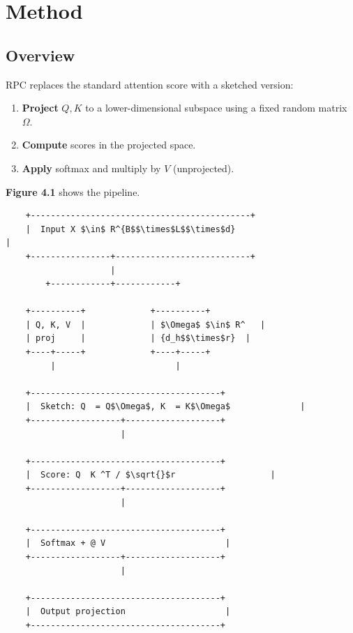 
\section{Method}

\subsection{Overview}

RPC replaces the standard attention score with a sketched version:

\begin{enumerate}
\item \textbf{Project} $Q, K$ to a lower-dimensional subspace using a fixed random
  matrix $\Omega$.
\item \textbf{Compute} scores in the projected space.
\item \textbf{Apply} softmax and multiply by $V$ (unprojected).

\end{enumerate}
\textbf{Figure 4.1} shows the pipeline.

\begin{lstlisting}
    +--------------------------------------------+
    |  Input X $\in$ R^{B$$\times$L$$\times$d}                        |
    +----------------+---------------------------+
                     |
        +------------+------------+
                                   
    +----------+             +----------+
    | Q, K, V  |             | $\Omega$ $\in$ R^   |
    | proj     |             | {d_h$$\times$r}  |
    +----+-----+             +----+-----+
         |                        |
                                   
    +--------------------------------------+
    |  Sketch: Q  = Q$\Omega$, K  = K$\Omega$              |
    +------------------+-------------------+
                       |
                        
    +--------------------------------------+
    |  Score: Q  K ^T / $\sqrt{}$r                   |
    +------------------+-------------------+
                       |
                        
    +--------------------------------------+
    |  Softmax + @ V                        |
    +------------------+-------------------+
                       |
                        
    +--------------------------------------+
    |  Output projection                    |
    +--------------------------------------+
\end{lstlisting}

